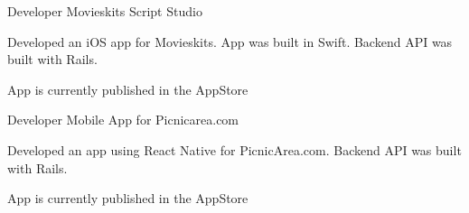 

\begin{cventries}

  \cventry
    {Developer} %
    {Movieskits Script Studio} %
    {} %
    {} %
    {
      \begin{cvitems} %
        \item {Developed an iOS app for Movieskits. App was built in Swift. Backend API was built with Rails.}
        \item {App is currently published in the AppStore}
      \end{cvitems}
    }
    {}

  \cventry
    {Developer} %
    {Mobile App for Picnicarea.com} %
    {} %
    {} %
    {
      \begin{cvitems} %
        \item {Developed an app using React Native for PicnicArea.com. Backend API was built with Rails.}
        \item {App is currently published in the AppStore}
      \end{cvitems}
    }
    {}




\end{cventries}

